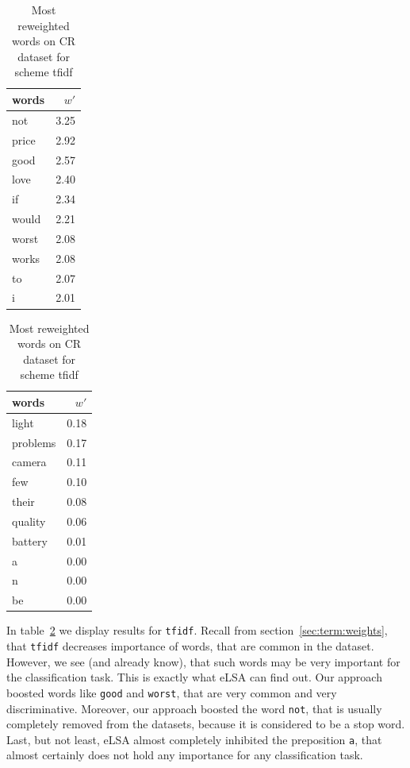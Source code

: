     
\begin{table}[h]
    \centering
    \begin{minipage}{.4\linewidth}
      \centering
        \begin{tabular}{lr}
\toprule
 words &  $w'$ \\
\midrule
   not &  3.25 \\
 price &  2.92 \\
  good &  2.57 \\
  love &  2.40 \\
    if &  2.34 \\
 would &  2.21 \\
 worst &  2.08 \\
 works &  2.08 \\
    to &  2.07 \\
     i &  2.01 \\
\bottomrule
\end{tabular}

    \end{minipage}
    \begin{minipage}{.4\linewidth}
      \centering
        \begin{tabular}{lr}
\toprule
    words &  $w'$ \\
\midrule
    light &  0.18 \\
 problems &  0.17 \\
   camera &  0.11 \\
      few &  0.10 \\
    their &  0.08 \\
  quality &  0.06 \\
  battery &  0.01 \\
        a &  0.00 \\
        n &  0.00 \\
       be &  0.00 \\
\bottomrule
\end{tabular}
    \end{minipage} 
    \caption{Most reweighted words on CR dataset for scheme tfidf}
    \label{tab:words:CR:tfidf}
\end{table}

    In table~\ref{tab:words:CR:tfidf} we display results for \texttt{tfidf}. 
    Recall from section~\ref{sec:term:weights}, that \texttt{tfidf} decreases importance of words, that are common in the dataset.
    However, we see (and already know), that such words may be very important for the classification task.
    This is exactly what eLSA can find out. 
    Our approach boosted words like \texttt{good} and \texttt{worst}, that are very common and very discriminative.
    Moreover, our approach boosted the word \texttt{not}, that is usually completely removed from the datasets, because it is considered to be a stop word. 
    Last, but not least, eLSA almost completely inhibited the preposition \texttt{a}, that almost certainly does not hold any importance for any classification task.


